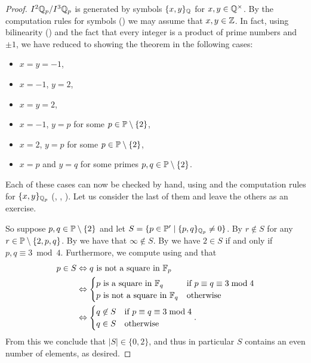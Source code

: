 \documentclass[12pt, leqno, british]{amsart}
\begin{document}
\begin{proof}
$I^2\mathbb Q_p/I^3\mathbb Q_p$ is generated by symbols $\lbrace x, y \rbrace_{\mathbb Q}$ for $x, y \in \mathbb Q^\times$.
By the computation rules for symbols () we may assume that $x, y \in \mathbb Z$.
In fact, using bilinearity () and the fact that every integer is a product of prime numbers and $\pm 1$, we have reduced to showing the theorem in the following cases:
\begin{itemize}
\item $x = y = -1$,
\item $x = -1$, $y = 2$,
\item $x = y = 2$,
\item $x = -1$, $y = p$ for some $p \in \mathbb P \setminus \lbrace 2 \rbrace$,
\item $x = 2$, $y = p$ for some $p \in \mathbb P \setminus \lbrace 2 \rbrace$,
\item $x = p$ and $y = q$ for some primes $p, q \in \mathbb P \setminus \lbrace 2 \rbrace$.
\end{itemize}
Each of these cases can now be checked by hand, using  and the computation rules for $\lbrace x, y \rbrace_{\mathbb Q_p}$ (, , ).
Let us consider the last of them and leave the others as an exercise.

So suppose $p, q \in \mathbb P \setminus \lbrace 2 \rbrace$ and let $S = \lbrace p \in \mathbb P' \mid \lbrace p, q \rbrace_{\mathbb Q_p} \neq 0 \rbrace$.
By  $r \not\in S$ for any $r \in \mathbb P \setminus \lbrace 2,p,q\rbrace$.
By  we have that $\infty \not\in S$.
By  we have $2 \in S$ if and only if $p, q \equiv 3 \bmod 4$.
Furthermore, we compute using  and  that
\begin{align*}
p \in S &\Leftrightarrow q \text{ is not a square in } \mathbb F_p \\
&\Leftrightarrow \begin{cases}
p \text{ is a square in } \mathbb F_q &\text{if } p \equiv q \equiv 3 \bmod 4 \\
p \text{ is not a square in } \mathbb F_q &\text{otherwise}
\end{cases} \\
&\Leftrightarrow \begin{cases}
q \not\in S &\text{if } p \equiv q \equiv 3 \bmod 4 \\
q \in S &\text{otherwise}
\end{cases}.
\end{align*}
From this we conclude that $\lvert S \rvert \in \lbrace 0, 2 \rbrace$, and thus in particular $S$ contains an even number of elements, as desired.
\end{proof}
\end{document}
